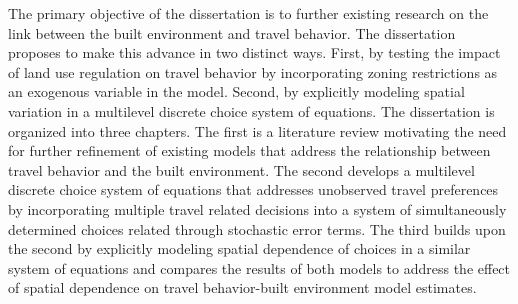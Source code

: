 The primary objective of the dissertation is to further existing research on the link between the built environment and travel behavior.  The dissertation proposes to make this advance in two distinct ways.  First, by testing the impact of land use regulation on travel behavior by incorporating zoning restrictions as an exogenous variable in the model.  Second, by explicitly modeling spatial variation in a multilevel discrete choice system of equations.  The dissertation is organized into three chapters.  The first is a literature review motivating the need for further refinement of existing models that address the relationship between travel behavior and the built environment.  The second develops a multilevel discrete choice system of equations that addresses unobserved travel preferences by incorporating multiple travel related decisions into a system of simultaneously determined choices related through stochastic error terms.  The third builds upon the second by explicitly modeling spatial dependence of choices in a similar system of equations and compares the results of both models to address the effect of spatial dependence on travel behavior-built environment model estimates.
